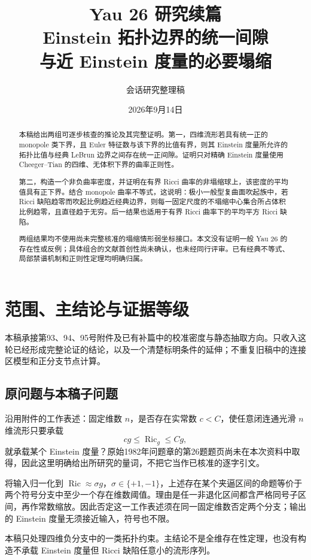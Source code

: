 \documentclass[UTF8,fontset=fandol,zihao=-4]{ctexart}
\title{Yau 26 研究续篇\\[2mm]\large Einstein 拓扑边界的统一间隙\\与近 Einstein 度量的必要塌缩}
\author{会话研究整理稿}
\date{2026年9月14日}
\theoremstyle{cn}
\DeclareMathOperator{\Ric}{Ric}
\numberwithin{equation}{section}
\begin{document}
\maketitle
\begin{abstract}
本稿给出两组可逐步核查的推论及其完整证明。第一，四维流形若具有统一正的 monopole 类下界，且 Euler 特征数与该下界的比值有界，则其 Einstein 度量所允许的拓扑比值与经典 LeBrun 边界之间存在统一正间隙。证明只对精确 Einstein 度量使用 Cheeger--Tian 的四维、无体积下界的曲率正则性。

第二，构造一个非负曲率密度，并证明在有界 Ricci 曲率的非塌缩球上，该密度的平均值具有正下界。结合 monopole 曲率不等式，这说明：极小一般型复曲面吹起族中，若 Ricci 缺陷趋零而吹起比例趋近经典边界，则每一固定尺度的不塌缩中心集合所占体积比例趋零，且直径趋于无穷。后一结果也适用于有界 Ricci 曲率下的平均平方 Ricci 缺陷。

两组结果均不使用尚未完整核准的塌缩情形弱坐标接口。本文没有证明一般 Yau 26 的存在性或反例；具体组合的文献首创性尚未确认，也未经同行评审。已有经典不等式、局部禁谱机制和正则性定理均明确归属。
\end{abstract}
\tableofcontents

\section{范围、主结论与证据等级}

本稿承接第93、94、95号附件及已有补篇中的校准密度与静态抽取方向。只收入这轮已经形成完整论证的结论，以及一个清楚标明条件的延伸；不重复旧稿中的连接区模型和正分支节点计算。

\subsection{原问题与本稿子问题}

沿用附件的工作表述：固定维数 $n$，是否存在实常数 $c<C$，使任意闭连通光滑 $n$ 维流形只要承载
\[
cg\le\Ric_g\le Cg,
\]
就承载某个 Einstein 度量？原始1982年问题章的第26题题页尚未在本次资料中取得，因此这里明确给出所研究的量词，不把它当作已核准的逐字引文。

将输入归一化到 $\Ric\approx\sigma g$，$\sigma\in\{+1,-1\}$，上述存在某个夹逼区间的命题等价于两个符号分支中至少一个存在维数阈值。理由是任一非退化区间都含严格同号子区间，再作常数缩放。因此否定这一工作表述须在同一固定维数否定两个分支；输出的 Einstein 度量无须接近输入，符号也不限。

本稿只处理四维负分支中的一类拓扑约束。主结论不是全维存在性定理，也没有构造不承载 Einstein 度量但 Ricci 缺陷任意小的流形序列。
\end{document}
